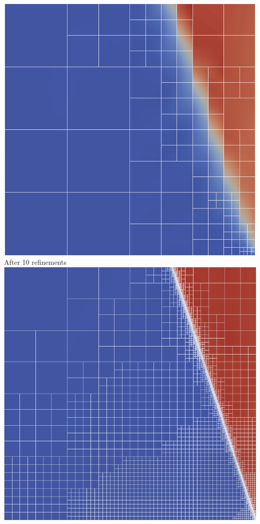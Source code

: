 \documentclass[18pt,xcolor=table]{beamer}
\begin{document}
\begin{frame}[t]
\begin{columns}[t]
\begin{column}[c]{0.28\textwidth}
\hspace{-2ex}\includegraphics[width=\textwidth]{Dissertation/Noh/Robust-mesh5.png}
\\After 10 refinements
\\
\hspace{-2ex}\includegraphics[width=\textwidth]{Dissertation/Noh/Robust-mesh10.png}
\end{column}
\end{columns}

\end{frame}
\end{document}
